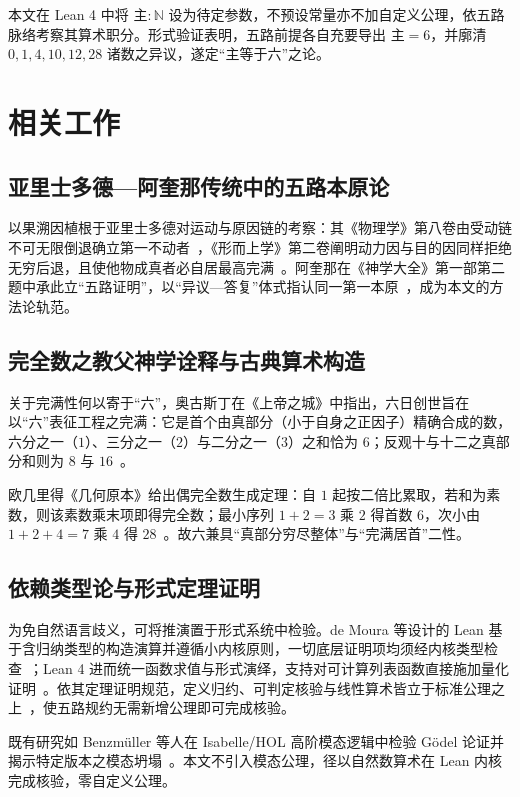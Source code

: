 \documentclass[11pt,a4paper]{ctexart}
\begin{document}
本文在 Lean 4 中将 $\text{主} : \mathbb{N}$ 设为待定参数，不预设常量亦不加自定义公理，依五路脉络考察其算术职分。形式验证表明，五路前提各自充要导出 $\text{主}=6$，并廓清 $0, 1, 4, 10, 12, 28$ 诸数之异议，遂定``主等于六''之论。

\section{相关工作}

\subsection{亚里士多德—阿奎那传统中的五路本原论}

以果溯因植根于亚里士多德对运动与原因链的考察：其《物理学》第八卷由受动链不可无限倒退确立第一不动者~\cite{physics}，《形而上学》第二卷阐明动力因与目的因同样拒绝无穷后退，且使他物成真者必自居最高完满~\cite{metaphysics}。阿奎那在《神学大全》第一部第二题中承此立``五路证明''，以``异议—答复''体式指认同一第一本原~\cite{aquinas}，成为本文的方法论轨范。

\subsection{完全数之教父神学诠释与古典算术构造}

关于完满性何以寄于``六''，奥古斯丁在《上帝之城》中指出，六日创世旨在以``六''表征工程之完满：它是首个由真部分（小于自身之正因子）精确合成的数，六分之一（$1$）、三分之一（$2$）与二分之一（$3$）之和恰为 $6$；反观十与十二之真部分和则为 $8$ 与 $16$~\cite{augustine}。

欧几里得《几何原本》给出偶完全数生成定理：自 $1$ 起按二倍比累取，若和为素数，则该素数乘末项即得完全数；最小序列 $1+2=3$ 乘 $2$ 得首数 $6$，次小由 $1+2+4=7$ 乘 $4$ 得 $28$~\cite{euclid}。故六兼具``真部分穷尽整体''与``完满居首''二性。

\subsection{依赖类型论与形式定理证明}

为免自然语言歧义，可将推演置于形式系统中检验。de Moura 等设计的 Lean 基于含归纳类型的构造演算并遵循小内核原则，一切底层证明项均须经内核类型检查~\cite{lean2015}；Lean 4 进而统一函数求值与形式演绎，支持对可计算列表函数直接施加量化证明~\cite{lean4}。依其定理证明规范，定义归约、可判定核验与线性算术皆立于标准公理之上~\cite{tpil}，使五路规约无需新增公理即可完成核验。

既有研究如 Benzmüller 等人在 Isabelle/HOL 高阶模态逻辑中检验 Gödel 论证并揭示特定版本之模态坍塌~\cite{modal}。本文不引入模态公理，径以自然数算术在 Lean 内核完成核验，零自定义公理。
\end{document}
